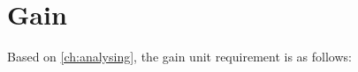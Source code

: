 \newcommand{\reqgain}{The delay unit must delay the input signal, in time defined by external unit.}

\section{Gain}
Based on \autoref{ch:analysing}, the gain unit requirement is as follows:

\begin{requirement}\label{req:gain_ex}
\end{requirement}



